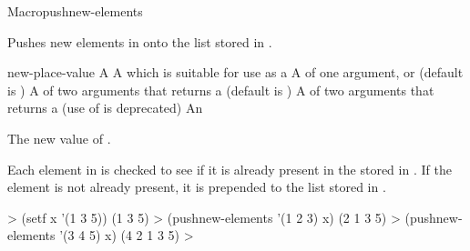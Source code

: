 \documentclass[10pt,twoside,english,pdftex]{article}
\begin{document}
\begin{functiondoc}{Macro}{pushnew-elements}{
    }
%
%
  
\fnsyntax

\fnpurpose Pushes new elements in  onto the list stored in
. 

\fnpackage {}

\fnmodule {}

\fnargs
\begin{args}{new-place-value}
\arg[list] A 
\arg[place] A  which is suitable for use as a
\arg[key] A  of one argument, or \nil{} (default is \nil)
\arg[test] A  of two arguments that returns a
 (default is ) 
 A  of two arguments that returns a
 (use of  is deprecated)
 An 
\end{args}

\fnreturns The new value of . 

\fndescription Each element in  is checked to see if it is
already present in the  stored in . If
the element is not already present, it is prepended to the list stored
in .

\fnexamples
%
\W\supp
\begin{example}
  > (setf x '(1 3 5))
  (1 3 5)
  > (pushnew-elements '(1 2 3) x)
  (2 1 3 5)
  > (pushnew-elements '(3 4 5) x)
  (4 2 1 3 5)
  >
\end{example}

\end{functiondoc}

\end{document}
